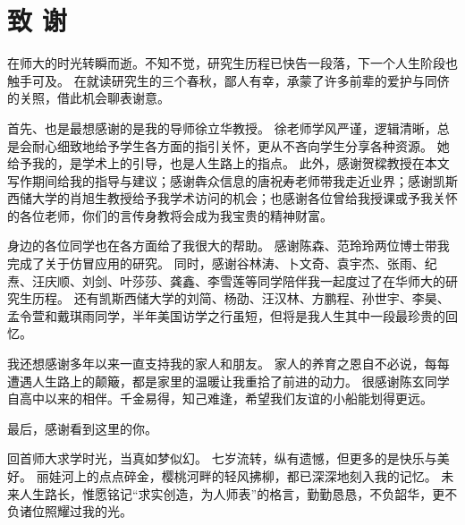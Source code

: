 
\chapter*{致 \quad 谢}

在师大的时光转瞬而逝。不知不觉，研究生历程已快告一段落，下一个人生阶段也触手可及。
在就读研究生的三个春秋，鄙人有幸，承蒙了许多前辈的爱护与同侪的关照，借此机会聊表谢意。

首先、也是最想感谢的是我的导师徐立华教授。
徐老师学风严谨，逻辑清晰，总是会耐心细致地给予学生各方面的指引关怀，更从不吝向学生分享各种资源。
她给予我的，是学术上的引导，也是人生路上的指点。
此外，感谢贺樑教授在本文写作期间给我的指导与建议；感谢犇众信息的唐祝寿老师带我走近业界；感谢凯斯西储大学的肖旭生教授给予我学术访问的机会；也感谢各位曾给我授课或予我关怀的各位老师，你们的言传身教将会成为我宝贵的精神财富。

身边的各位同学也在各方面给了我很大的帮助。
感谢陈森、范玲玲两位博士带我完成了关于仿冒应用的研究。
同时，感谢谷林涛、卜文奇、袁宇杰、张雨、纪焘、汪庆顺、刘剑、叶莎莎、龚鑫、李雪莲等同学陪伴我一起度过了在华师大的研究生历程。
还有凯斯西储大学的刘简、杨劭、汪汉林、方鹏程、孙世宇、李昊、孟令萱和戴琪雨同学，半年美国访学之行虽短，但将是我人生其中一段最珍贵的回忆。

我还想感谢多年以来一直支持我的家人和朋友。
家人的养育之恩自不必说，每每遭遇人生路上的颠簸，都是家里的温暖让我重拾了前进的动力。
很感谢陈玄同学自高中以来的相伴。千金易得，知己难逢，希望我们友谊的小船能划得更远。

最后，感谢看到这里的你。

回首师大求学时光，当真如梦似幻。
七岁流转，纵有遗憾，但更多的是快乐与美好。
丽娃河上的点点碎金，樱桃河畔的轻风拂柳，都已深深地刻入我的记忆。
未来人生路长，惟愿铭记``求实创造，为人师表''的格言，勤勤恳恳，不负韶华，更不负诸位照耀过我的光。

